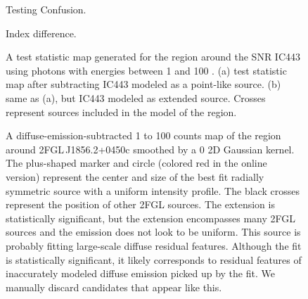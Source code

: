\documentclass[12pt,preprint]{aastex}
\newif\ifcolorfigure
\newcommand{\gev}{\text{GeV}\xspace}
\begin{document}
\clearpage
\begin{figure}
    \ifcolorfigure
    \plotone{mc_plots/confusion_plot_color.eps}
    \else
    \fi
    \caption{Testing Confusion.
    }\label{confusion_plot}
  \end{figure}

\clearpage
\begin{figure}
    \ifcolorfigure
    \plotone{mc_plots/index_difference_color.eps}
    \else
    \fi
    \caption{Index difference.
    }\label{index_difference}
  \end{figure}


\begin{figure}
  \ifcolorfigure
    \plotone{ic443_plots/res_tsmap_ic443_color.eps}
    \else
    \fi

  \caption{
  A test statistic map generated for the region around the SNR 
  IC443 using 
  photons with energies between
  1 \gev and 100 \gev.  (a) test statistic map after
  subtracting IC443 modeled as a point-like source. (b) same as (a), but
  IC443 modeled as extended source. Crosses represent sources included
  in the model of the region.}
  \label{res_tsmaps}
\end{figure}

\clearpage
\begin{figure}
    \ifcolorfigure
    \plotone{source_plots/example_bad_fit_color.eps}
    \else
    \fi
    \caption{
    A diffuse-emission-subtracted 1 \gev to 100 \gev counts map of the
    region around 2FGL\,J1856.2+0450c smoothed by a 0 2D Gaussian
    kernel. The plus-shaped marker and circle (colored red in
    the online version) represent the center and size of the best fit
    radially symmetric source with a uniform intensity profile.  The black
    crosses represent the position of other 2FGL sources.  The extension
    is statistically significant, but the extension encompasses many 2FGL
    sources and the emission does not look to be uniform. This source
    is probably fitting large-scale diffuse residual features. Although
    the fit is statistically significant, it likely corresponds to
    residual features of inaccurately modeled diffuse emission picked
    up by the fit.  We manually discard candidates that appear like this.
    }
    \label{example_bad_fit}
\end{figure}
\end{document}
